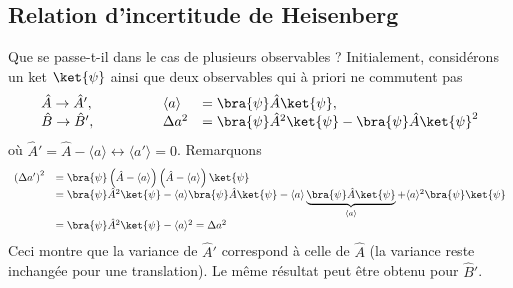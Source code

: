  \subsection{Relation d'incertitude de Heisenberg}
 Que se passe-t-il dans le cas de plusieurs observables ?
 Initialement, considérons un ket $\ket{\psi}$ ainsi que deux observables qui 
 à priori ne commutent pas
 \begin{equation}
 \begin{array}{lll}
 \hat{A}\rightarrow\hat{A}',\qquad\qquad &\langle a\rangle &= \bra{\psi}\hat{A}\ket{\psi},\\
 \hat{B}\rightarrow\hat{B}',\qquad\qquad &\Delta a^2 &= \bra{\psi}\hat{A}^2\ket{\psi}
 -\bra{\psi}\hat{A}\ket{\psi}^2
 \end{array}
 \end{equation}
 où $\hat{A}' = \hat{A}-\langle a\rangle \leftrightarrow \langle a'\rangle=0$. Remarquons 
 \begin{equation}
 \begin{array}{ll}
 \left(\Delta a'\right)^2 &= \bra{\psi}\left(\hat{A}-\langle a\rangle\right)
 \left(\hat{A}-\langle a\rangle\right)\ket{\psi}\\
 &= \bra{\psi}\hat{A}^2\ket{\psi} - \langle a\rangle\bra{\psi}\hat{A}\ket{\psi}-\langle a
 \rangle\underbrace{\bra{\psi}\hat{A}\ket{\psi}}_{\langle a\rangle} + \langle a\rangle^2\bra{\psi}\ket{\psi}\\
 &= \bra{\psi}\hat{A}^2\ket{\psi} - \langle a\rangle^2 = \Delta a^2
 \end{array}
 \end{equation}
 Ceci montre que la variance de $\hat{A}'$ correspond à celle de $\hat{A}$ (la variance reste 
 inchangée pour une translation). Le même résultat peut être obtenu pour $\hat{B}'$.\\
 
